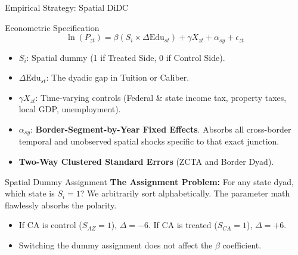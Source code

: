 \documentclass[10pt, aspectratio=169]{beamer}
\begin{document}

\begin{frame}{Empirical Strategy: Spatial DiDC}
    \begin{block}{Econometric Specification}
    $$ \ln(P_{zt}) = \beta (S_i \times \Delta \text{Edu}_{st}) + \gamma X_{zt} + \alpha_{sy} + \epsilon_{zt} $$
    \end{block}
    
    \begin{itemize}
        \item $S_i$: Spatial dummy (1 if Treated Side, 0 if Control Side).
        \item $\Delta \text{Edu}_{st}$: The dyadic gap in Tuition or Caliber.
        \item $\gamma X_{zt}$: Time-varying controls (Federal \& state income tax, property taxes, local GDP, unemployment).
        \item $\alpha_{sy}$: \textbf{Border-Segment-by-Year Fixed Effects}. Absorbs all cross-border temporal and unobserved spatial shocks specific to that exact junction.
        \item \textbf{Two-Way Clustered Standard Errors} (ZCTA and Border Dyad).
    \end{itemize}
\end{frame}

\begin{frame}{Spatial Dummy Assignment}
    \textbf{The Assignment Problem:} For any state dyad, which state is $S_i=1$? We arbitrarily sort alphabetically. The parameter math flawlessly absorbs the polarity.
    
    \begin{center}
    \end{center}
    
    \begin{itemize}
        \item If CA is control ($S_{AZ}=1$), $\Delta = -6$. If CA is treated ($S_{CA}=1$), $\Delta = +6$. 
        \item Switching the dummy assignment does not affect the $\beta$ coefficient.
    \end{itemize}
\end{frame}
\end{document}
